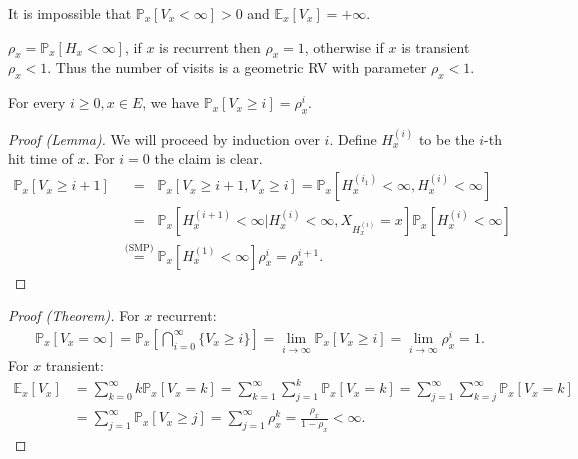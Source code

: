 \begin{rmk}[]
It is impossible that $\mathbb{P}_{x} \left[ V_x<\infty \right] >0 $ and $\mathbb{E}_{x} \left[ V_x \right] =+\infty$.
\end{rmk}


\begin{defn}
	$\rho_x = \mathbb{P}_{x} \left[ H_x<\infty \right]$, if $x$ is recurrent then $\rho_x=1$, otherwise if $x$ is transient $\rho_x<1$. Thus the number of visits is a geometric RV with parameter $\rho_x<1$.
\end{defn}

\begin{lemma}[]
	For every $i\geq 0, x \in E$, we have $\mathbb{P}_{x} \left[ V_x \geq i \right] = \rho_x^{i}$.
\end{lemma}

\begin{proof}[Proof (Lemma)]
	We will proceed by induction over $i$. Define $H_x^{(i)}$ to be the $i$-th hit time of $x$. For $i=0$ the claim is clear.
	\begin{align}
		\mathbb{P}_{x} \left[ V_x \geq i+1 \right] &\stackrel{\phantom{\text{(SMP)}}}{=} \mathbb{P}_{x} \left[ V_x \geq i+1, V_x \geq i \right] = \mathbb{P}_{x} \left[ H_x^{(i_1)} < \infty, H_x^{(i)} < \infty \right] \\
		&\stackrel{\phantom{\text{(SMP)}}}{=} \mathbb{P}_{x} \left[ H_x^{(i+1)} < \infty | H_x^{(i)} < \infty, X_{H_x^{(i)}}=x \right] \mathbb{P}_{x} \left[ H_x^{(i)} < \infty \right] \\
		&\stackrel{\text{(SMP)}}{=} \mathbb{P}_{x} \left[ H_x^{(1)} < \infty \right] \rho_x^i = \rho_x^{i+1}   
	.\end{align}
\end{proof}

\begin{proof}[Proof (Theorem)]
	For $x$ recurrent: 
	\begin{align}
		\mathbb{P}_{x} \left[ V_x = \infty \right] = \mathbb{P}_{x} \left[ \bigcap_{i=0}^{\infty} \{V_x \geq i\} \right] = \lim_{i\to \infty} \mathbb{P}_{x} \left[ V_x \geq i \right] = \lim_{i \to \infty} \rho_x^{i} = 1 
	.\end{align}
	For $x$ transient:
	\begin{align}
		\mathbb{E}_{x} \left[ V_x \right] &= \sum_{k=0}^{\infty} k \mathbb{P}_{x} \left[ V_x = k \right] = \sum_{k=1}^{\infty} \sum_{j=1}^{k} \mathbb{P}_{x} \left[ V_x=k \right] = \sum_{j=1}^{\infty} \sum_{k=j}^{\infty} \mathbb{P}_{x} \left[ V_x=k \right] \\
	&= \sum_{j=1}^{\infty} \mathbb{P}_{x} \left[ V_x \geq j \right] = \sum_{j=1}^{\infty} \rho_x^k = \frac{\rho_x}{1-\rho_x} < \infty
	.\end{align}
\end{proof}

